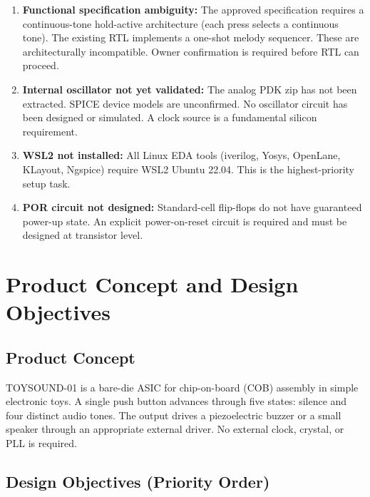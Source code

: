 \documentclass[11pt,a4paper]{article}
\begin{document}
\begin{enumerate}[label=\textbf{\color{unknown}\Alph*.}]
  \item \textbf{Functional specification ambiguity:} The approved specification requires a
    continuous-tone hold-active architecture (each press selects a continuous tone).
    The existing RTL implements a one-shot melody sequencer. These are architecturally
    incompatible. Owner confirmation is required before RTL can proceed.

  \item \textbf{Internal oscillator not yet validated:} The analog PDK zip has not been
    extracted. SPICE device models are unconfirmed. No oscillator circuit has been designed
    or simulated. A clock source is a fundamental silicon requirement.

  \item \textbf{WSL2 not installed:} All Linux EDA tools (iverilog, Yosys, OpenLane, KLayout,
    Ngspice) require WSL2 Ubuntu 22.04. This is the highest-priority setup task.

  \item \textbf{POR circuit not designed:} Standard-cell flip-flops do not have guaranteed
    power-up state. An explicit power-on-reset circuit is required and must be designed at
    transistor level.
\end{enumerate}

\section{Product Concept and Design Objectives}

\subsection{Product Concept}

TOYSOUND-01 is a bare-die ASIC for chip-on-board (COB) assembly in simple electronic toys.
A single push button advances through five states: silence and four distinct audio tones.
The output drives a piezoelectric buzzer or a small speaker through an appropriate external
driver. No external clock, crystal, or PLL is required.

\subsection{Design Objectives (Priority Order)}
\end{document}

